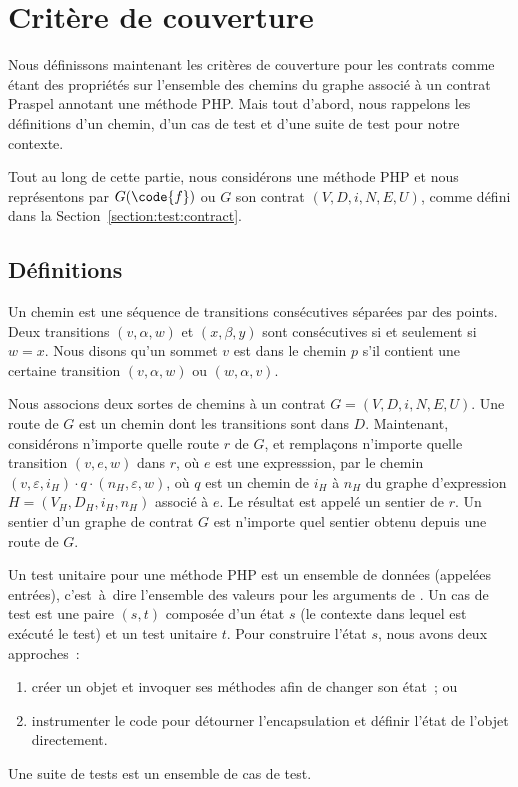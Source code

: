 \section{Critère de couverture}
\label{section:test:criteria}

Nous définissons maintenant les critères de couverture pour les contrats comme
étant des propriétés sur l'ensemble des chemins du graphe associé à un contrat
Praspel annotant une méthode PHP. Mais tout d'abord, nous rappelons les
définitions d'un chemin, d'un cas de test et d'une suite de test pour notre
contexte.

Tout au long de cette partie, nous considérons une méthode PHP  et nous
représentons par $G(\code{f})$ ou $G$ son contrat $(V, D, i, N, E, U)$, comme
défini dans la Section~\ref{section:test:contract}.

\subsection{Définitions}

Un {\strong chemin} est une séquence de transitions consécutives séparées par
des points. Deux transitions $(v, \alpha, w)$ et $(x, \beta, y)$ sont
consécutives si et seulement si $w = x$. Nous disons qu'un sommet $v$ {\strong
est dans} le chemin $p$ s'il contient une certaine transition $(v, \alpha, w)$
ou $(w, \alpha, v)$.

Nous associons deux sortes de chemins à un contrat $G = (V, D, i, N, E, U)$. Une
{\strong route} de $G$ est un chemin dont les transitions sont dans $D$.
Maintenant, considérons n'importe quelle route $r$ de $G$, et remplaçons
n'importe quelle transition $(v, e, w)$ dans $r$, où $e$ est une expresssion,
par le chemin $(v, \varepsilon, i_H) \cdot q \cdot (n_H, \varepsilon, w)$, où
$q$ est un chemin de $i_H$ à $n_H$ du graphe d'expression $H = (V_H, D_H, i_H,
n_H)$ associé à $e$.  Le résultat est appelé un {\strong sentier} de $r$. Un
sentier d'un graphe de contrat $G$ est n'importe quel sentier obtenu depuis une
route de $G$.

Un {\strong test unitaire} pour une méthode PHP  est un ensemble de
données (appelées entrées), c'est~à~dire l'ensemble des valeurs pour les
arguments de . Un {\strong cas de test} est une paire $(s, t)$ composée
d'un état $s$ (le contexte dans lequel est exécuté le test) et un test unitaire
$t$. Pour construire l'état $s$, nous avons deux approches~:
%
\begin{enumerate}

\item créer un objet et invoquer ses méthodes afin de changer son état~; ou

\item instrumenter le code pour détourner l'encapsulation et définir l'état de
l'objet directement.

\end{enumerate}
%
Une {\strong suite de tests} est un ensemble de cas de test.

